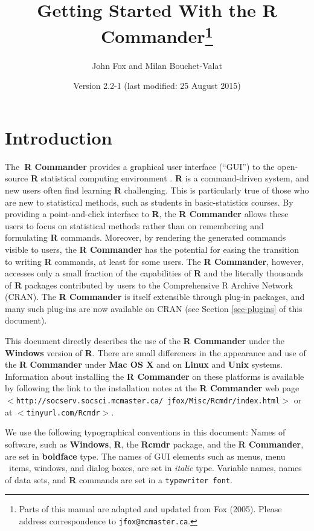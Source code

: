 \documentclass{article}%
\begin{document}
\title{Getting Started With the R Commander\thanks{Parts of this manual are adapted
and updated from Fox (2005). Please address correspondence to
\texttt{jfox@mcmaster.ca}. }}
\author{John Fox and Milan Bouchet-Valat}
\date{Version 2.2-1 (last modified: 25 August 2015)}
\maketitle

\section{Introduction}

The\textbf{\ R Commander} \citep{Fox05} provides a graphical user
interface (\textquotedblleft GUI\textquotedblright) to the open-source
\textbf{R } statistical computing environment \citep{RCore15}. \textbf{R} is a command-driven system, and new users
often find learning \textbf{R} challenging. This is particularly true of those
who are new to statistical methods, such as students in basic-statistics
courses. By providing a point-and-click interface to \textbf{R}, the \textbf{R
Commander} allows these users to focus on statistical methods rather than on
remembering and formulating \textbf{R} commands. Moreover, by rendering the
generated commands visible to users, the \textbf{R Commander} has the
potential for easing the transition to writing \textbf{R} commands, at least
for some users. The \textbf{R Commander}, however, accesses only a small
fraction of the capabilities of \textbf{R} and the literally thousands of
\textbf{R} packages contributed by users to the Comprehensive R Archive
Network (CRAN). The \textbf{R Commander} is itself extensible through plug-in
packages, and many such plug-ins are now available on CRAN (see Section
\ref{sec-plugins} of this document).

This document directly describes the use of the \textbf{R Commander} under the
\textbf{Windows} version of \textbf{R}. There are small differences in the
appearance and use of the \textbf{R Commander} under \textbf{Mac OS X} and on
\textbf{Linux} and \textbf{Unix} systems. Information about installing the
\textbf{R Commander} on these platforms is available by following the link to
the installation notes at the \textbf{R Commander} web page
$<$\texttt{http://socserv.socsci.mcmaster.ca/ jfox/Misc/Rcmdr/index.html}$>$ or at
$<$\texttt{tinyurl.com/Rcmdr}$>$.

We use the following typographical conventions in this document: Names of
software, such as \textbf{Windows}, \textbf{R}, the \textbf{Rcmdr} package,
and the \textbf{R Commander}, are set in \textbf{boldface} type. The names of
GUI elements such as menus, menu \ items, windows, and dialog boxes, are set
in \emph{italic} type. Variable names, names of data sets, and \textbf{R}
commands are set in a \texttt{typewriter font}.
\end{document}

